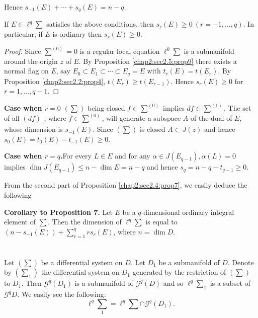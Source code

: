 Hence $s_{-1} (E) + \cdots + s_q (E) = n-q$.

\begin{proposition}\label{chap2:sec2.5:prop11}  %
  If $E \in \ell^q \sum$ satisfies the above conditions,  then $s_r
  (E) \geq 0 ~ (r = - 1,  \ldots ,  q)$. In particular,  if $E$ is
  ordinary then $s_r (E) \ge 0$. 
\end{proposition}

\begin{proof}
  Since $\sum^{(0)} = 0$ is a regular local equation $\ell^0 \sum$ is
  a submanifold around the origin $z$ of $E$. By
  Proposition \ref{chap2:sec2.5:prop9} there
  exists a normal flag on $E$,  say $E_0 \subset E_1 \subset \cdots
  \subset E_q = E$ with $t_r (E) = t(E_r)$. By Proposition
  \ref{chap2:sec2.2:prop4}, $t(E_r)
  \ge t (E_{r-1})$. Hence $s_r (E) \geq 0$ for $r=1,  \ldots ,  q-1$.  
\end{proof}

\noindent
\textbf{Case when {\boldmath $r = 0$}} $(\sum)$ being closed $f \in \sum^{(0)}$
implies $df \in \sum^{(1)}$. The set of all $(df)_z$,  where $f \in
\sum^{(0)}$,  will generate a subspace $A$ of the dual of $E$,  whose
dimension is $s_{-1} (E)$. Since $(\sum)$ is  closed $A \subset J(z)$
and hence $s_0 (E) = t_0 (E) - t _{-1} (E) \ge 0$. 
 
\noindent
\textbf{Case when {\boldmath $r = q$}.}\pageoriginale For every $L \in E$ and for any $\alpha
\in J(E_{q-1}),  \alpha (L) = 0$ implies $\dim J(E_{q-1}) \le n - \dim
E = n-q$ and hence $s_q = n - q - t_{q-1} \ge 0$. 
 
 From the second part of Proposition \ref{chap2:sec2.4:prop7},  we
 easily deduce the following 

\noindent 
\textbf{Corollary to Proposition 7.}
Let $E$ be a $q$-dimensional ordinary integral element of $\sum$. Then
the dimension of $\ell^q \sum$ is equal to $(n - s_{-1} (E)) +
\sum^q_{r = 1} r s_r (E)$,  where $n = \dim D$. 

\section{}\label{chap2:sec2.6}

Let $(\sum)$ be a differential system on $D$. Let $D_1$ be a
submanifold of $D$. Denote by $(\sum_1)$ the differential system on
$D_1$ generated by the restriction of $(\sum)$ to $D_1$. Then
$\mathscr{G}^q (D_1)$ is a submanifold of $\mathscr{G}^q (D)$ and so
$\ell^q \sum_1$ is a subset of $\mathscr{G}^q D$. We easily see the
following: 
 $$
 \ell^q \sum_1 = \ell^q \sum \cap \mathscr{G}^q (D_1).
 $$
 
